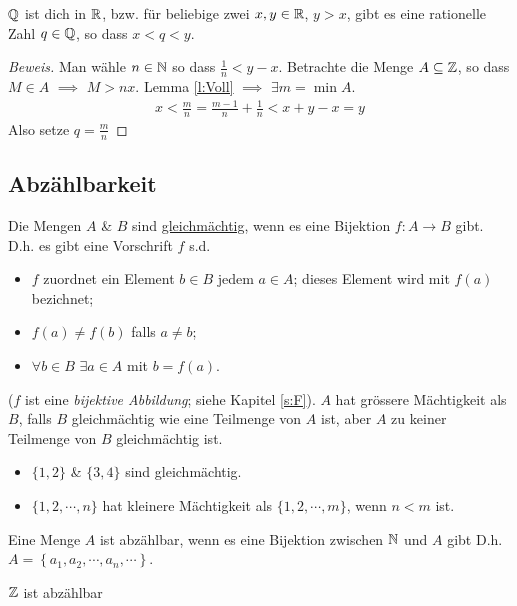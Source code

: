 \begin{Sat}
  $\mathbb{Q}$ ist dich in $\mathbb{R}$, bzw. für beliebige zwei $x,y\in\mathbb{R}$, $y>x$, gibt es eine rationelle Zahl $q\in\mathbb{Q}$, so dass $x<q<y$.
\end{Sat}
\begin{proof}[Beweis]
  Man wähle $n\in\mathbb{N}$ so dass $\frac{1}{n}<y-x$. Betrachte die Menge $A\subseteq\mathbb{Z}$, so dass $M\in A$ $\implies$ $M>nx$. Lemma \ref{l:Voll} $\implies$ $\exists m=\min A$.
  \begin{align*}
    x<\frac{m}{n}=\frac{m-1}{n}+\frac{1}{n}<x+y-x=y
  \end{align*}
  Also setze $q=\frac{m}{n}$
\end{proof}
\subsection{Abzählbarkeit}
\begin{Def}
  Die Mengen $A$ \& $B$ sind \underline{gleichmächtig}, wenn es eine Bijektion $f:A\to B$ gibt. D.h. es gibt eine Vorschrift $f$ s.d.
\begin{itemize}
\item $f$ zuordnet ein Element $b\in B$ jedem $a \in A$; dieses Element wird mit $f(a)$ bezichnet;
\item $f(a)\neq f(b)$ falls $a\neq b$; 
\item $\forall b\in B$ $\exists a\in A$ mit $b= f(a)$.
\end{itemize}
($f$ ist eine {\em bijektive Abbildung}; siehe Kapitel \ref{s:F}).
$A$ hat gr\"ossere Mächtigkeit als $B$, falls $B$ gleichmächtig wie eine Teilmenge von $A$ ist, aber $A$ zu keiner Teilmenge von $B$ gleichmächtig ist.
\end{Def}
\begin{Bsp}
  \begin{itemize}
    \item $\{1,2\}$ \& $\{3,4\}$ sind gleichmächtig.
    \item $\{1,2,\cdots,n\}$ hat kleinere Mächtigkeit als $\{1,2,\cdots,m\}$, wenn $n<m$ ist.
  \end{itemize}
\end{Bsp}
\begin{Def}
  Eine Menge $A$ ist abzählbar, wenn es eine Bijektion zwischen $\mathbb{N}$ und $A$ gibt
D.h. $A=\left\{ a_1,a_2,\cdots,a_n,\cdots \right\}$.
\end{Def}
\begin{Lem}
  $\mathbb{Z}$ ist abzählbar
\end{Lem}
